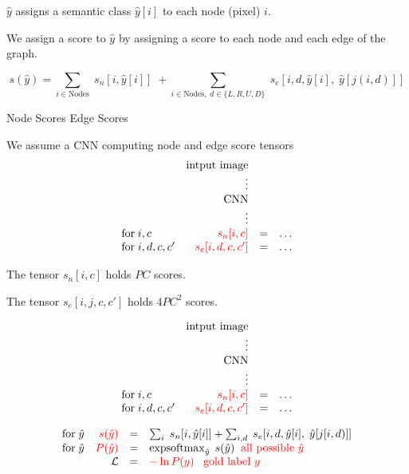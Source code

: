 {


$\hat{y} $ assigns a semantic class $\hat{y}[i]$ to each node (pixel) $i$.

\vfill
We assign a score to $\hat{y}$ by assigning a score to each node and each edge of the graph.

{\color{red} $$s(\hat{y}) = \sum_{i \in \mathrm{Nodes}}\; s_n[i,\hat{y}[i]]\; + \sum_{i \in \mathrm{Nodes},\;d \in \{L,R,U,D\}}\;s_e[i,d,\hat{y}[i],\;\hat{y}[j(i,d)]]$$}
\centerline{Node Scores \hspace{6em}Edge Scores \hspace{3em}~}



We assume a CNN computing {\color{red} node and edge score tensors}
\vfill
$$\begin{array}{lrcl}
& \mbox{intput image} \\
& \vdots \\
& \mbox{CNN} \\
& \vdots \\
\mathrm{for}\;i,c & \;{\color{red} s_n[i,c]} & = & \ldots \\
\mathrm{for}\;i,d,c,c' & {\color{red} s_e[i,d,c,c']} & = & \ldots \\
\end{array}$$

\vfill
The tensor {\color{red} $s_n[i,c]$} holds $PC$ scores.

\vfill
The tensor {\color{red} $s_e[i,j,c,c']$} holds $4PC^2$ scores.

$$\begin{array}{lrcl}
& \mbox{intput image} \\
& \vdots \\
& \mbox{CNN} \\
& \vdots \\
\mathrm{for}\;i,c & \;{\color{red} s_n[i,c]} & = & \ldots \\
\mathrm{for}\;i,d,c,c' & {\color{red} s_e[i,d,c,c']} & = & \ldots
\end{array}$$

\vfill
$$\begin{array}{lrcl}
\mbox{for}\;\hat{y} & {\color{red} s(\hat{y})} & = & \sum_i\;s_n[i,\hat{y}[i]] + \sum_{i,d}\;s_e[i,d,\hat{y}[i],\;\hat{y}[j[i,d)]] \\
\mbox{for}\;\hat{y} & {\color{red} P(\hat{y})} & = & \operatorname*{expsoftmax}_{\hat{y}}\;s(\hat{y}) \;\;\mbox{\color{red} all possible $\hat{y}$} \\
 & {\cal L} & = & {\color{red} - \ln P(y) \;\;\;\mbox{gold label $y$}}
\end{array}$$

}
